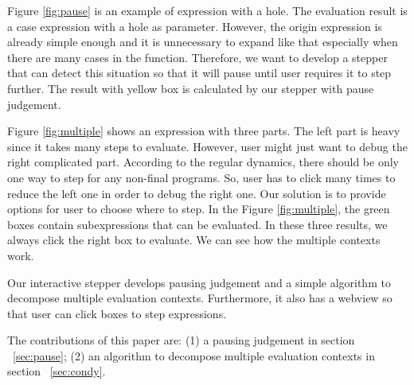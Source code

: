 
Figure \ref{fig:pause} is an example of expression with a hole. The evaluation result is a case expression with a hole as parameter. However, the origin expression is already simple enough and it is unnecessary to expand like that especially when there are many cases in the function. Therefore, we want to develop a stepper that can detect this situation so that it will pause until user requires it to step further. The result with yellow box is calculated by our stepper with pause judgement.

Figure \ref{fig:multiple} shows an expression with three parts. The left part is heavy since it takes many steps to evaluate. However, user might just want to debug the right complicated part. According to the regular dynamics, there should be only one way to step for any non-final programs. So, user has to click many times to reduce the left one in order to debug the right one. Our solution is to provide options for user to choose where to step. In the Figure \ref{fig:multiple}, the green boxes contain subexpressions that can be evaluated. In these three results, we always click the right box to evaluate. We can see how the multiple contexts work.

Our interactive stepper develops pausing judgement and a simple algorithm to decompose multiple evaluation contexts. Furthermore, it also has a webview so that user can click boxes to step expressions.

 The contributions of this paper are: (1) a pausing judgement in section ~\ref{sec:pause}; (2) an algorithm to decompose multiple evaluation contexts in section ~\ref{sec:condy}.